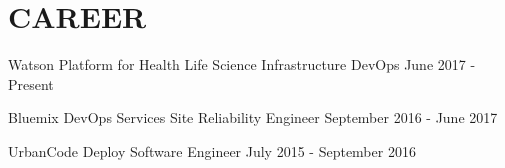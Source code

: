 \documentclass[]{dylan-resume}
\begin{document}
\lastupdated




\hfill
\begin{minipage}[t]{1.00\textwidth}


\section{CAREER}
\hspace*{\fill}
\vspace{\topsep} %
\begin{tightemize}
\item Watson Platform for Health Life Science Infrastructure DevOps \hspace*{\fill}June 2017 - Present
\item Bluemix DevOps Services Site Reliability Engineer \hspace*{\fill}September 2016 - June 2017
\item UrbanCode Deploy Software Engineer \hspace*{\fill}July 2015 - September 2016
\end{tightemize}
\sectionsep



\end{minipage}
\end{document}
